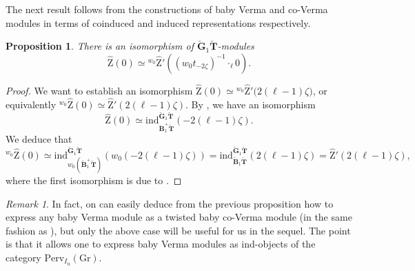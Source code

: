 \documentclass[11pt]{amsart}
\theoremstyle{plain}
\newtheorem{prop}[thm]{Proposition}
\theoremstyle{remark}
\newtheorem{rem}[thm]{Remark}
\numberwithin{equation}{section}
\begin{document}
 The next result follows from the constructions of baby Verma and co-Verma modules in terms of coinduced and induced representations respectively.
 \begin{prop}
     There is an isomorphism of $\check{\mathbf{G}}_1\check{\mathbf{T}}$-modules
     $$\widehat{\mathrm{Z}}(0)\simeq {^{w_0}\widehat{\mathrm{Z}}'((w_0t_{-2\zeta})^{-1}\cdot_\ell0)}. $$
 \end{prop}
 \begin{proof}
     We want to establish an isomorphism $\widehat{\mathrm{Z}}(0)\simeq {^{w_0}\widehat{\mathrm{Z}}'(2(\ell-1)\zeta}) $, or equivalently $^{w_0}\widehat{\mathrm{Z}}(0)\simeq \widehat{\mathrm{Z}}'(2(\ell-1)\zeta) $. By \cite[Lemma 9.2, Part II]{jantzen2003representations}, we have an isomorphism
     $$\widehat{\mathrm{Z}}(0)\simeq \mathrm{ind}^{\check{\mathbf{G}}_1\check{\mathbf{T}}}_{\check{\mathbf{B}}_1^+\check{\mathbf{T}}}(-2(\ell-1)\zeta). $$
     We deduce that
     $$^{w_0}\widehat{\mathrm{Z}}(0)\simeq \mathrm{ind}^{\check{\mathbf{G}}_1\check{\mathbf{T}}}_{w_0(\check{\mathbf{B}}_1^+\check{\mathbf{T}})}(w_0(-2(\ell-1)\zeta))=\mathrm{ind}^{\check{\mathbf{G}}_1\check{\mathbf{T}}}_{\check{\mathbf{B}}_1\check{\mathbf{T}}}(2(\ell-1)\zeta)=\widehat{\mathrm{Z}}'(2(\ell-1)\zeta), $$
     where the first isomorphism is due to \cite[(4)-I.3.5]{jantzen2003representations}.
 \end{proof}
\begin{rem}
     In fact, on can easily deduce from the previous proposition how to express any baby Verma module as a twisted baby co-Verma module (in the same fashion as \cite[Corollary 3.2.11]{ABBGM}), but only the above case will be useful for us in the sequel. The point is that it allows one to express baby Verma modules as ind-objects of the category $\mathrm{Perv}_{I_\mathrm{u}}(\mathrm{Gr})$.
\end{rem}
\end{document}

